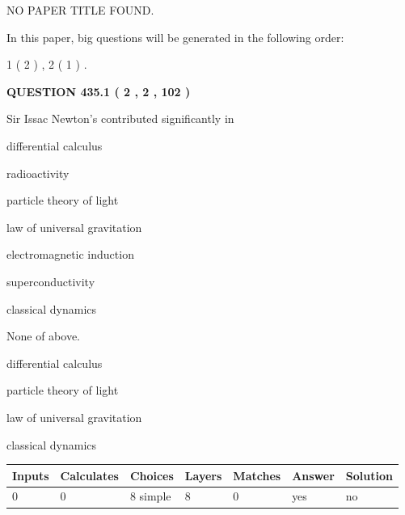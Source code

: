 \documentclass[12pt]{article}
\begin{document}
   
\vspace{0.2in}
   
   
   
   
   
   
 NO PAPER TITLE FOUND.
   
   
   
\vspace{0.2in}
   
In this paper, big questions will be generated in the following order: 
   
   
   1 ( 2 )
 ,
   2 ( 1 )
 .
  
\vspace{0.2in}
  
{\textbf{\Large{QUESTION
435.1 
 ( 2 , 2 , 102 )
}}}
  
  
Sir Issac Newton's contributed significantly in
 
 
differential calculus
 
 
radioactivity
 
 
particle theory of light
 
 
law of universal gravitation
 
 
electromagnetic induction
 
 
superconductivity
 
 
classical dynamics
 
 
 None of above.
 
 
\noindent{}
 
 
differential calculus
 
 
particle theory of light
 
 
law of universal gravitation
 
 
classical dynamics
 
 
\noindent{}
 
 
   
   
   
   
\noindent\begin{tabular}{|l|l|l|l|l|l|l|}
 \hline
Inputs & Calculates & Choices & Layers & Matches & Answer & Solution \\ \hline
 0  & 
 0  & 
 8
  simple  
  & 
 8  & 
 0  & 
  yes & 
  no 
  \\ \hline
 \end{tabular}
   
\end{document}

